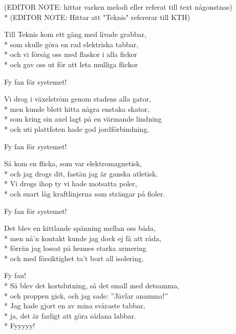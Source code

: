 \begin{SongText}[Laborationsvisan]
    \begin{SongInfo}
        (EDITOR NOTE: hittar varken melodi eller referat till text någonstnas)\\*%
        (EDITOR NOTE: Hittar att "Teknis" refererar till KTH)
    \end{SongInfo}
    \begin{SongVerse}
        Till Teknis kom ett gäng med livade grabbar,\\*%
        som skulle göra en rad elektriska tabbar,\\*%
        och vi försåg oss med flaskor i alla fickor\\*%
        och gav oss ut för att leta mulliga flickor
    \end{SongVerse}
    \begin{SongVerse}
        Fy fan för systemet!
    \end{SongVerse}
    \begin{SongVerse}
        Vi drog i växelström genom stadens alla gator,\\*%
        men kunde blott hitta några enstaka skator,\\*%
        som kring sin axel lagt på en värmande lindning\\*%
        och uti plattfoten hade god jordförbindning.
    \end{SongVerse}
    \begin{SongVerse}
        Fy fan för systemet!
    \end{SongVerse}
    \begin{SongVerse}
        Så kom en flicka, som var elektromagnetisk,\\*%
        och jag drogs dit, fastän jag är ganska atletisk.\\*%
        Vi drogs ihop ty vi hade motsatta poler,\\*%
        och snart låg kraftlinjerna som strängar på fioler.
    \end{SongVerse}
    \begin{SongVerse}
        Fy fan för systemet!
    \end{SongVerse}
    \begin{SongVerse}
        Det blev en kittlande spänning mellan oss båda,\\*%
        men nå’n kontakt kunde jag dock ej få att råda,\\*%
        förrän jag lossat på hennes starka armering\\*%
        och med försiktighet ta’t bort all isolering.
    \end{SongVerse}
    \begin{SongVerse}
        Fy fan!\\*%
        Så blev det kortslutning, så det small med detsamma,\\*%
        och proppen gick, och jag sade: ”Jävlar anamma!”\\*%
        Jag hade gjort en av mina svåraste tabbar,\\*%
        ja, det är farligt att göra sådana labbar.\\*%
        Fyyyyy!
    \end{SongVerse}
\end{SongText}